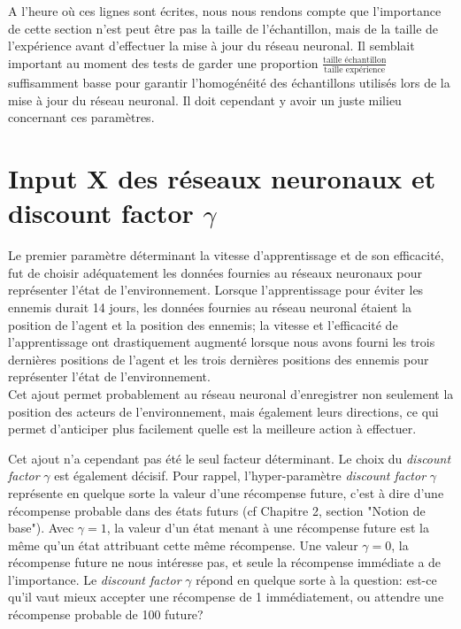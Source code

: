 \documentclass[11pt,a4paper]{report}
\begin{document}
   \par A l'heure où ces lignes sont écrites, nous nous rendons compte que l'importance de cette section n'est peut être pas la taille de l'échantillon, mais de la taille de l’expérience avant d'effectuer la mise à jour du réseau neuronal. Il semblait important au moment des tests de garder une proportion $\frac{\text{taille échantillon}}{\text{taille expérience}}$ suffisamment basse pour garantir l'homogénéité des échantillons utilisés lors de la mise à jour du réseau neuronal. Il doit cependant y avoir un juste milieu concernant ces paramètres. 
   
   \section{Input X des réseaux neuronaux et discount factor $\gamma$}
   
   \par Le premier paramètre déterminant la vitesse d'apprentissage et de son efficacité, fut de choisir adéquatement les données fournies au réseaux neuronaux pour représenter l'état de l'environnement. Lorsque l'apprentissage pour éviter les ennemis durait 14 jours, les données fournies au réseau neuronal étaient la position de l'agent et la position des ennemis; la vitesse et l’efficacité de l'apprentissage ont drastiquement augmenté lorsque nous avons fourni les trois dernières positions de l'agent et les trois dernières positions des ennemis pour représenter l'état de l'environnement. \\
   Cet ajout permet probablement au réseau neuronal d'enregistrer non seulement la position des acteurs de l'environnement, mais également leurs directions, ce qui permet d'anticiper plus facilement quelle est la meilleure action à effectuer. 
   
   \par Cet ajout n'a cependant pas été le seul facteur déterminant. Le choix du \textit{discount factor} $\gamma$ est également décisif. Pour rappel, l'hyper-paramètre \textit{discount factor} $\gamma$ représente en quelque sorte la valeur d'une récompense future, c'est à dire d'une récompense probable dans des états futurs (cf Chapitre 2, section "Notion de base"). Avec $\gamma = 1$, la valeur d'un état menant à une récompense future est la même qu'un état attribuant cette même récompense. Une valeur $\gamma = 0$, la récompense future ne nous intéresse pas, et seule la récompense immédiate a de l'importance. Le \textit{discount factor} $\gamma$ répond en quelque sorte à la question: est-ce qu'il vaut mieux accepter une récompense de 1 immédiatement, ou attendre une récompense probable de 100 future? 
   
\end{document}
